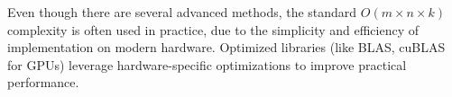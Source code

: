 Even though there are several advanced methods, the standard \(O(m \times n \times k)\) complexity is often used in practice, due to the simplicity and efficiency of implementation on modern hardware. Optimized libraries (like BLAS, cuBLAS for GPUs) leverage hardware-specific optimizations to improve practical performance.






